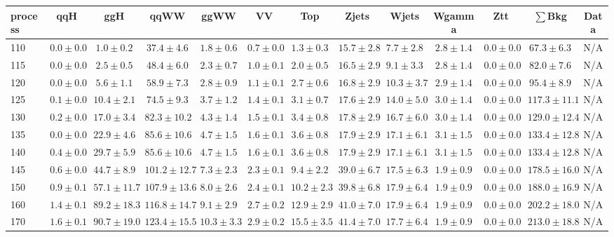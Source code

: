 \begin{table}
{%
 \tiny
 \begin{center}
 \begin{tabular}{l | c c | c c c c c c c c  | c c}
 \hline
 process & qqH & ggH & qqWW & ggWW & VV & Top & Zjets & Wjets & Wgamma & Ztt & $\sum$Bkg & Data \\
 \hline
110 & $0.0\pm0.0$ & $1.0\pm0.2$ & $37.4\pm4.6$ & $1.8\pm0.6$ & $0.7\pm0.0$ & $1.3\pm0.3$ & $15.7\pm2.8$ & $7.7\pm2.8$ & $2.8\pm1.4$ & $0.0\pm0.0$ & $67.3\pm6.3$ & N/A \\
115 & $0.0\pm0.0$ & $2.5\pm0.5$ & $48.4\pm6.0$ & $2.3\pm0.7$ & $1.0\pm0.1$ & $2.0\pm0.5$ & $16.5\pm2.9$ & $9.1\pm3.3$ & $2.8\pm1.4$ & $0.0\pm0.0$ & $82.0\pm7.6$ & N/A \\
120 & $0.0\pm0.0$ & $5.6\pm1.1$ & $58.9\pm7.3$ & $2.8\pm0.9$ & $1.1\pm0.1$ & $2.7\pm0.6$ & $16.8\pm2.9$ & $10.3\pm3.7$ & $2.9\pm1.4$ & $0.0\pm0.0$ & $95.4\pm8.9$ & N/A \\
125 & $0.1\pm0.0$ & $10.4\pm2.1$ & $74.5\pm9.3$ & $3.7\pm1.2$ & $1.4\pm0.1$ & $3.1\pm0.7$ & $17.6\pm2.9$ & $14.0\pm5.0$ & $3.0\pm1.4$ & $0.0\pm0.0$ & $117.3\pm11.1$ & N/A \\
130 & $0.2\pm0.0$ & $17.0\pm3.4$ & $82.3\pm10.2$ & $4.3\pm1.4$ & $1.5\pm0.1$ & $3.4\pm0.8$ & $17.8\pm2.9$ & $16.7\pm6.0$ & $3.0\pm1.4$ & $0.0\pm0.0$ & $129.0\pm12.4$ & N/A \\
135 & $0.0\pm0.0$ & $22.9\pm4.6$ & $85.6\pm10.6$ & $4.7\pm1.5$ & $1.6\pm0.1$ & $3.6\pm0.8$ & $17.9\pm2.9$ & $17.1\pm6.1$ & $3.1\pm1.5$ & $0.0\pm0.0$ & $133.4\pm12.8$ & N/A \\
140 & $0.4\pm0.0$ & $29.7\pm5.9$ & $85.6\pm10.6$ & $4.7\pm1.5$ & $1.6\pm0.1$ & $3.6\pm0.8$ & $17.9\pm2.9$ & $17.1\pm6.1$ & $3.1\pm1.5$ & $0.0\pm0.0$ & $133.4\pm12.8$ & N/A \\
145 & $0.6\pm0.0$ & $44.7\pm8.9$ & $101.2\pm12.7$ & $7.3\pm2.3$ & $2.3\pm0.1$ & $9.4\pm2.2$ & $39.0\pm6.7$ & $17.5\pm6.3$ & $1.9\pm0.9$ & $0.0\pm0.0$ & $178.5\pm16.0$ & N/A \\
150 & $0.9\pm0.1$ & $57.1\pm11.7$ & $107.9\pm13.6$ & $8.0\pm2.6$ & $2.4\pm0.1$ & $10.2\pm2.3$ & $39.8\pm6.8$ & $17.9\pm6.4$ & $1.9\pm0.9$ & $0.0\pm0.0$ & $188.0\pm16.9$ & N/A \\
160 & $1.4\pm0.1$ & $89.2\pm18.3$ & $116.8\pm14.7$ & $9.1\pm2.9$ & $2.7\pm0.2$ & $12.9\pm2.9$ & $41.0\pm7.0$ & $17.9\pm6.4$ & $1.9\pm0.9$ & $0.0\pm0.0$ & $202.2\pm18.0$ & N/A \\
170 & $1.6\pm0.1$ & $90.7\pm19.0$ & $123.4\pm15.5$ & $10.3\pm3.3$ & $2.9\pm0.2$ & $15.5\pm3.5$ & $41.4\pm7.0$ & $17.7\pm6.4$ & $1.9\pm0.9$ & $0.0\pm0.0$ & $213.0\pm18.8$ & N/A \\

\end{tabular}
\end{center}}
\end{table}
